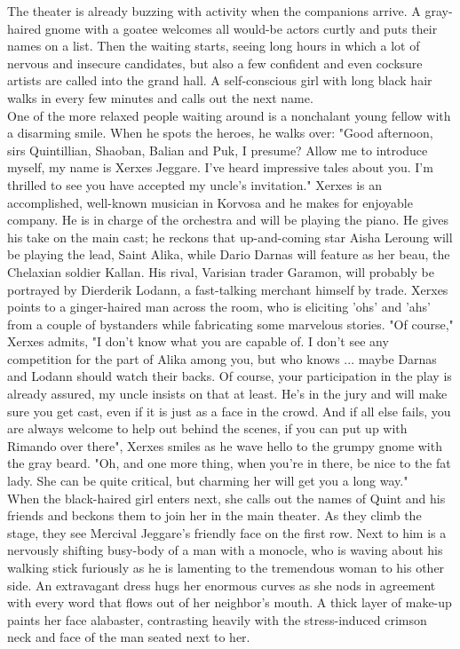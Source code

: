 The theater is already buzzing with activity when the companions arrive. A gray-haired gnome with a goatee welcomes all would-be actors curtly and puts their names on a list. Then the waiting starts, seeing long hours in which a lot of nervous and insecure candidates, but also a few confident and even cocksure artists are called into the grand hall. A self-conscious girl with long black hair walks in every few minutes and calls out the next name.\\

One of the more relaxed people waiting around is a nonchalant young fellow with a disarming smile. When he spots the heroes, he walks over: "Good afternoon, sirs Quintillian, Shaoban, Balian and Puk, I presume? Allow me to introduce myself, my name is Xerxes Jeggare. I've heard impressive tales about you. I'm thrilled to see you have accepted my uncle's invitation." Xerxes is an accomplished, well-known musician in Korvosa and he makes for enjoyable company. He is in charge of the orchestra and will be playing the piano. He gives his take on the main cast; he reckons that up-and-coming star Aisha Leroung will be playing the lead, Saint Alika, while Dario Darnas will feature as her beau, the Chelaxian soldier Kallan. His rival, Varisian trader Garamon, will probably be portrayed by Dierderik Lodann, a fast-talking merchant himself by trade. Xerxes points to a ginger-haired man across the room, who is eliciting 'ohs' and 'ahs' from a couple of bystanders while fabricating some marvelous stories. "Of course," Xerxes admits, "I don't know what you are capable of. I don't see any competition for the part of Alika among you, but who knows ... maybe Darnas and Lodann should watch their backs. Of course, your participation in the play is already assured, my uncle insists on that at least. He's in the jury and will make sure you get cast, even if it is just as a face in the crowd. And if all else fails, you are always welcome to help out behind the scenes, if you can put up with Rimando over there", Xerxes smiles as he wave hello to the grumpy gnome with the gray beard. "Oh, and one more thing, when you're in there, be nice to the fat lady. She can be quite critical, but charming her will get you a long way."\\

When the black-haired girl enters next, she calls out the names of Quint and his friends and beckons them to join her in the main theater. As they climb the stage, they see Mercival Jeggare's friendly face on the first row. Next to him is a nervously shifting busy-body of a man with a monocle, who is waving about his walking stick furiously as he is lamenting to the tremendous woman to his other side. An extravagant dress hugs her enormous curves as she nods in agreement with every word that flows out of her neighbor's mouth. A thick layer of make-up paints her face alabaster, contrasting heavily with the stress-induced crimson neck and face of the man seated next to her.\\

